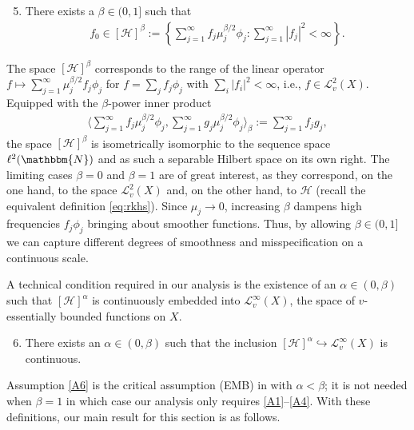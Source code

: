 \documentclass[11pt]{article}
\theoremstyle{definition}
\theoremstyle{remark}
\begin{document}
\begin{enumerate} [label=(A\arabic*), ref=(A\arabic*)]
\setcounter{enumi}{4}
\item \label{A5} There exists a $\beta \in (0,1]$ such that
\begin{align*}
f_0 \in [\mathcal{H}]^{\beta} := \left\{ \sum_{j=1}^{\infty} f_j \mu^{\beta/2}_j \phi_j: \sum_{j=1}^{\infty} |f_j|^2 < \infty \right\}.
\end{align*}
\end{enumerate}
The space $[\mathcal{H}]^{\beta}$ corresponds to the range of the linear operator $f \mapsto \sum_{j=1}^{\infty} \mu_j^{\beta/2} f_j \phi_j$ for $f = \sum_j f_j \phi_j$ with $\sum_i |f_i|^2<\infty$, i.e., $f \in \mathcal{L}_v^2(X)$. Equipped with the $\beta$-power inner product
\begin{align*}
\bigg \langle\sum_{j=1}^{\infty} f_j \mu^{\beta/2}_j \phi_j,  \sum_{j=1}^{\infty} g_j \mu^{\beta/2}_j \phi_j \bigg \rangle_{\beta} := \sum_{j=1}^{\infty} f_j g_j,
\end{align*}
the space $[\mathcal{H}]^{\beta}$ is isometrically isomorphic to the sequence space $\ell^2(\mathbbm{N})$ and as such a separable Hilbert space on its own right. The limiting cases $\beta = 0$ and $\beta=1$ are of great interest, as they correspond, on the one hand, to the space $\mathcal{L}^2_v(X)$ and, on the other hand, to $\mathcal{H}$ (recall the equivalent definition \eqref{eq:rkhs}). Since $\mu_j \to 0$, increasing $\beta$ dampens high frequencies $f_j \phi_j$ bringing about smoother functions. Thus, by allowing $\beta \in (0,1]$ we can capture different degrees of smoothness and misspecification on a continuous scale.

A technical condition required in our analysis is the existence of an $\alpha \in (0, \beta)$ such that  $[\mathcal{H}]^{\alpha}$ is continuously embedded into $\mathcal{L}_{v}^{\infty}(X)$, the space of $v$-essentially bounded functions on $X$.
\begin{enumerate} [label=(A\arabic*), ref=(A\arabic*)]
\setcounter{enumi}{5}
\item \label{A6} There exists an $\alpha \in (0,\beta)$ such that the inclusion  $[\mathcal{H}]^{\alpha} \hookrightarrow \mathcal{L}^{\infty}_v(X)$ is continuous.
\end{enumerate}
Assumption \ref{A6} is the critical assumption (EMB) in \citep{Fischer:2020} with $\alpha < \beta$; it is not needed when $\beta = 1$ in which case our analysis only requires \ref{A1}--\ref{A4}. With these definitions, our main result for this section is as follows. 
\end{document}
